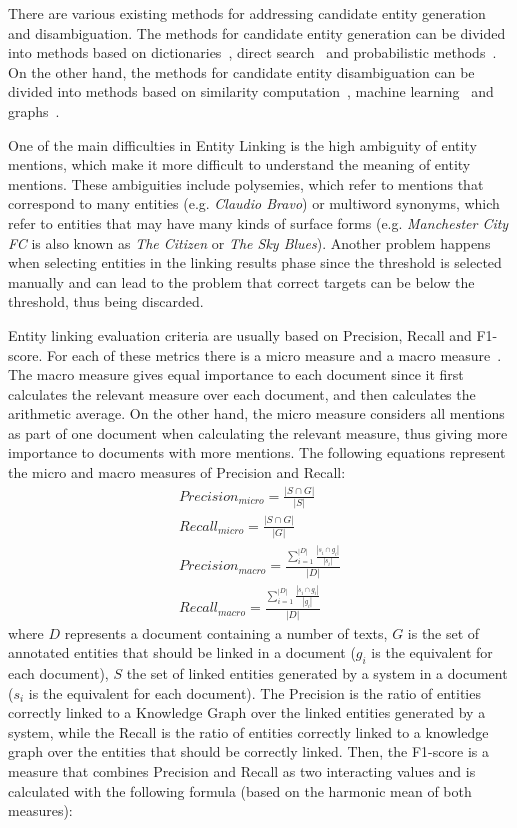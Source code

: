 There are various existing methods for addressing candidate entity generation and 
disambiguation. The methods for candidate entity generation can be divided into methods 
based on dictionaries~\cite{infExtr:ZhangSTW10, infExtr:HanSZ11}, 
direct search~\cite{infExtr:McNameeMLOD11, infExtr:DredzeMRGF10} and 
probabilistic methods~\cite{infExtr:ganea2016, infExtr:PanCHJK15}. On the other hand, the 
methods for candidate entity disambiguation can be divided into methods based on 
similarity computation~\cite{infExtr:Cucerzan07, infExtr:BunescuP06}, 
machine learning~\cite{infExtr:ganea2016, infExtr:ZhangSTW10} 
and graphs~\cite{infExtr:GongFLSH17, infExtr:HanSZ11}.

One of the main difficulties in Entity Linking is the high ambiguity of entity mentions, 
which make it more difficult to understand the meaning of entity mentions. These ambiguities 
include polysemies, which refer to mentions that correspond to many entities (e.g. 
\textit{Claudio Bravo}) or multiword synonyms, which refer to entities that may have many 
kinds of surface forms (e.g. \textit{Manchester City FC} is also known as \textit{The Citizen} 
or \textit{The Sky Blues}). Another problem happens when selecting entities in the linking 
results phase since the threshold is selected manually and can lead to the problem that 
correct targets can be below the threshold, thus being discarded.

Entity linking evaluation criteria are usually based on Precision, Recall and 
F1-score. For each of these metrics there is a micro measure and a macro 
measure~\cite{entlin:CornoltiFC13}. The macro measure gives equal importance to each 
document since it first calculates the relevant measure over each document, and then 
calculates the arithmetic average. On the other hand, the micro measure considers all 
mentions as part of one document when calculating the relevant measure, thus giving more 
importance to documents with more mentions. The following equations represent the micro and 
macro measures of Precision and Recall:
\begin{align*} 
    Precision_{micro} = \frac{|S \cap G|}{|S|} \\
    Recall_{micro} = \frac{|S \cap G|}{|G|} \\
    Precision_{macro} = \frac{\sum_{i=1}^{|D|} \frac{|s_i \cap g_i |}{|s_i|}}{|D|} \\
    Recall_{macro} = \frac{\sum_{i=1}^{|D|} \frac{|s_i \cap g_i |}{|g_i|}}{|D|}
\end{align*}
\noindent where $D$ represents a document containing a number of texts, $G$ is the set of annotated 
entities that should be linked in a document ($g_i$ is the equivalent for each document), 
$S$ the set of linked entities generated by a system in a document ($s_i$ is the equivalent 
for each document). The Precision is the ratio of entities correctly linked to a Knowledge 
Graph over the linked entities generated by a system, while the Recall is the ratio of 
entities correctly linked to a knowledge graph over the entities that should be correctly 
linked. Then, the F1-score is a measure that combines Precision and Recall as two 
interacting values and is calculated with the following formula (based on the harmonic 
mean of both measures):

